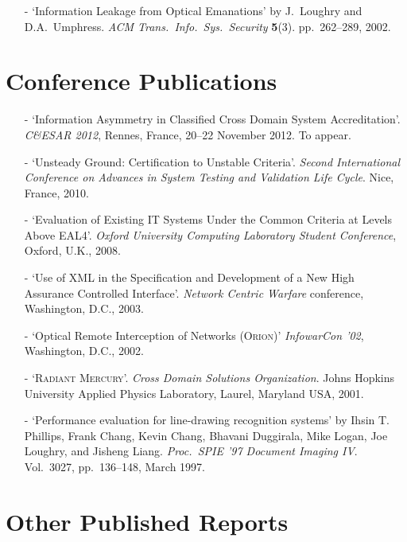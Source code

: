 \documentclass[letterpaper]{article}
\begin{document}
\begin{itemize}
    \item[-] `Information Leakage from Optical Emanations' by J.\ Loughry
    and D.A.\ Umphress. \emph{ACM Trans.\ Info.\ Sys.\ Security} \textbf{5}(3).
    pp.\ 262--289, 2002.
\end{itemize}

\section*{Conference Publications} %

\begin{itemize}
	\item[-] `Information Asymmetry in Classified Cross Domain System Accreditation'.
		\emph{C\&ESAR 2012}, Rennes, France, 20--22 November 2012.  To appear.

	\item[-] `Unsteady Ground: Certification to Unstable Criteria'.
		\emph{Second International Conference on Advances in System Testing
		and Validation Life Cycle}. Nice, France, 2010. 

	\item[-] `Evaluation of Existing IT Systems Under the Common Criteria
		at Levels Above EAL4'. \emph{Oxford University
		Computing Laboratory Student Conference}, Oxford, U.K., 2008.

    \item[-] `Use of XML in the Specification and Development of a New High
		Assurance Controlled Interface'. \emph{Network Centric Warfare} conference,
		Washington, D.C., 2003.

    \item[-] `Optical Remote Interception of Networks (\textsc{Orion})'
		\emph{InfowarCon '02}, Washington, D.C., 2002.

    \item[-] `\textsc{Radiant Mercury}'. \emph{Cross Domain Solutions
		Organization}. Johns Hopkins University Applied Physics Laboratory,
		Laurel, Maryland USA, 2001.

    \item[-] `Performance evaluation for line-drawing recognition systems'
		by Ihsin T. Phillips, Frank Chang, Kevin Chang, Bhavani Duggirala,
		Mike Logan, Joe Loughry, and Jisheng Liang. \emph{Proc.\ SPIE '97
		Document Imaging IV}. Vol.\ 3027, pp.\ 136--148, March 1997.
\end{itemize}

\section*{Other Published Reports} %
\end{document}
